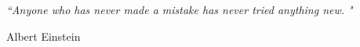 
\pagestyle{empty} %

\null\vfill %

\textit{``Anyone who has never made a mistake has never tried anything new. "}

\begin{flushright}
Albert Einstein 
\end{flushright}